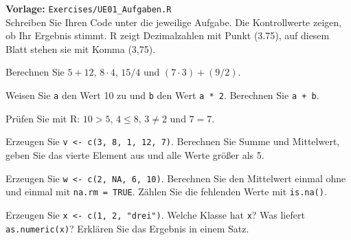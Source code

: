 


\textbf{Vorlage:} \texttt{Exercises/UE01\_Aufgaben.R}\\
Schreiben Sie Ihren Code unter die jeweilige Aufgabe. Die Kontrollwerte zeigen, ob Ihr Ergebnis stimmt. R zeigt Dezimalzahlen mit Punkt (3.75), auf diesem Blatt stehen sie mit Komma (3,75).

Berechnen Sie $5 + 12$, $8 \cdot 4$, $15 / 4$ und $(7 \cdot 3) + (9 / 2)$.

Weisen Sie \texttt{a} den Wert 10 zu und \texttt{b} den Wert \texttt{a * 2}. Berechnen Sie \texttt{a + b}.

Prüfen Sie mit R: $10 > 5$, $4 \le 8$, $3 \ne 2$ und $7 = 7$.

Erzeugen Sie \texttt{v <- c(3, 8, 1, 12, 7)}. Berechnen Sie Summe und Mittelwert, geben Sie das vierte Element aus und alle Werte größer als 5.

Erzeugen Sie \texttt{w <- c(2, NA, 6, 10)}. Berechnen Sie den Mittelwert einmal ohne und einmal mit \texttt{na.rm = TRUE}. Zählen Sie die fehlenden Werte mit \texttt{is.na()}.

Erzeugen Sie \texttt{x <- c(1, 2, "drei")}. Welche Klasse hat \texttt{x}? Was liefert \texttt{as.numeric(x)}? Erklären Sie das Ergebnis in einem Satz.


